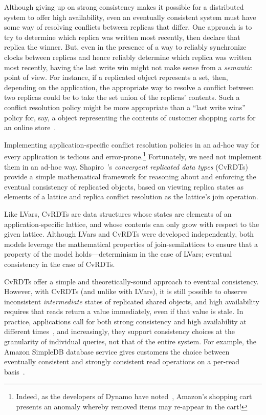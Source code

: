 Although giving up on strong consistency makes it possible for a
distributed system to offer high availability, even an eventually
consistent system must have some way of resolving conflicts between
replicas that differ.  One approach is to try to determine which
replica was written most recently, then declare that replica the
winner.  But, even in the presence of a way to reliably synchronize
clocks between replicas and hence reliably determine which replica was
written most recently, having the last write win might not make sense
from a \emph{semantic} point of view.  For instance, if a replicated
object represents a set, then, depending on the application, the
appropriate way to resolve a conflict between two replicas could be to
take the set union of the replicas' contents.  Such a conflict
resolution policy might be more appropriate than a ``last write wins''
policy for, say, a object representing the contents of customer
shopping carts for an online store~\cite{dynamo}.

Implementing application-specific conflict resolution policies in an
ad-hoc way for every application is tedious and
error-prone.\footnote{Indeed, as the developers of Dynamo have
  noted~\cite{dynamo}, Amazon's shopping cart presents an anomaly
  whereby removed items may re-appear in the cart!}  Fortunately, we
need not implement them in an ad-hoc way. Shapiro~\etal's
\emph{convergent replicated data types} (CvRDTs)~\cite{crdts,crdts-tr}
provide a simple mathematical framework for reasoning about and
enforcing the eventual consistency of replicated objects, based on
viewing replica states as elements of a lattice and replica conflict
resolution as the lattice's join operation.

Like LVars, CvRDTs are data structures whose states are elements of an
application-specific lattice, and whose contents can only grow with
respect to the given lattice.  Although LVars and CvRDTs were
developed independently, both models leverage the mathematical
properties of join-semilattices to ensure that a property of the model
holds---determinism in the case of LVars; eventual consistency in the
case of CvRDTs.  

CvRDTs offer a simple and theoretically-sound approach to eventual
consistency.  However, with CvRDTs (and unlike with LVars), it is
still possible to observe inconsistent \emph{intermediate} states of
replicated shared objects, and high availability requires that reads
return a value immediately, even if that value is stale.  In practice,
applications call for both strong consistency and high availability at
different times~\cite{pileus}, and increasingly, they support
consistency choices at the granularity of individual queries, not that
of the entire system.  For example, the Amazon SimpleDB database
service gives customers the choice between eventually consistent and
strongly consistent read operations on a per-read
basis~\cite{simpledb-vogels-article}.

